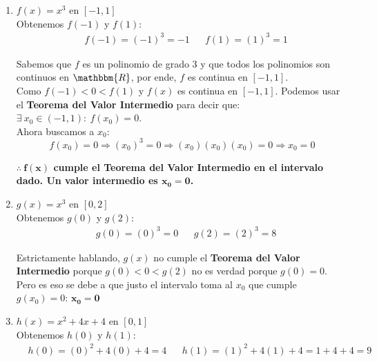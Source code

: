 \documentclass[12pt]{article}
\begin{document}
\begin{enumerate}[\hspace{9px} a)]
    \item \(f(x)=x^3\) en $[-1,1]$\\

        Obtenemos $f(-1)$ y $f(1)$:
        \begin{align*}
            &f(-1) = (-1)^3 = -1  &&f(1) = (1)^3 = 1
        \end{align*}

        Sabemos que $f$ es un polinomio de grado 3 y que todos los polinomios son continuos en $\mathbbm{R}$, por ende, $f$ es continua en $[-1,1]$.\\

        Como $f(-1) < 0 < f(1)$ y $f(x)$ es continua en $[-1,1]$. Podemos usar el \textbf{Teorema del Valor Intermedio} para decir que: \(\exists \ x_0 \in (-1,1) : \ f(x_0)=0\).\\

        Ahora buscamos a $x_0$:
        \begin{equation*}
            f(x_0)=0 \Rightarrow (x_0)^3 = 0 \Rightarrow (x_0)(x_0)(x_0)=0 \Rightarrow x_0=0
        \end{equation*}

        \textbf{$\mathbf{\therefore \ f(x)}$ cumple el Teorema del Valor Intermedio en el intervalo dado. Un valor intermedio es $\mathbf{x_0=0}$.}\\

    \item \(g(x)=x^3\) en $[0,2]$\\

        Obtenemos $g(0)$ y $g(2)$:
        \begin{align*}
            &g(0)=(0)^3=0 &&g(2)=(2)^3=8
        \end{align*}

        Estrictamente hablando, $g(x)$ no cumple el \textbf{Teorema del Valor Intermedio} porque \(g(0) < 0 < g(2)\) no es verdad porque $g(0)=0$. Pero es eso se debe a que justo el intervalo toma al $x_0$ que cumple $g(x_0)=0$: $\mathbf{x_0=0}$\\

    \item \(h(x)=x^2+4x+4\) en $[0,1]$\\

        Obtenemos $h(0)$ y $h(1)$:
        \begin{align*}
            &h(0)=(0)^2+4(0)+4=4 &&h(1)=(1)^2+4(1)+4=1+4+4=9
        \end{align*}


\end{enumerate}
\end{document}
